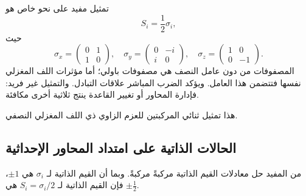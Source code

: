 \begin{classroomqa}
\end{classroomqa}

\begin{classroomqa}
\end{classroomqa}

تمثيل مفيد على نحو خاص هو
\begin{equation}
S_i=\frac12\sigma_i,
\end{equation}
حيث
\begin{equation}
\sigma_x=
\begin{pmatrix}
0&1\\
1&0
\end{pmatrix},
\quad
\sigma_y=
\begin{pmatrix}
0&-i\\
i&0
\end{pmatrix},
\quad
\sigma_z=
\begin{pmatrix}
1&0\\
0&-1
\end{pmatrix}.
\end{equation}
المصفوفات من دون عامل النصف هي مصفوفات باولي؛ أما مؤثرات اللف المغزلي نفسها فتتضمن هذا العامل. ويؤكد الضرب المباشر علاقات التبادل. والتمثيل غير فريد: فإدارة المحاور أو تغيير القاعدة ينتج ثلاثية أخرى مكافئة.

هذا تمثيل ثنائي المركبتين للعزم الزاوي ذي اللف المغزلي النصفي.

\subsection{الحالات الذاتية على امتداد المحاور الإحداثية}

من المفيد حل معادلات القيم الذاتية مركبةً مركبةً. وبما أن القيم الذاتية لـ \(\sigma_i\) هي \(\pm1\)، فإن القيم الذاتية لـ \(S_i=\sigma_i/2\) هي \(\pm\tfrac12\).

